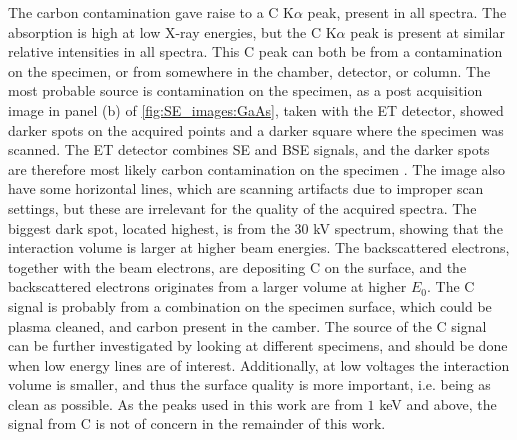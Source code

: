 The carbon contamination gave raise to a C K$\alpha$ peak, present in all spectra.
The absorption is high at low X-ray energies, but the C K$\alpha$ peak is present at similar relative intensities in all spectra.
This C peak can both be from a contamination on the specimen, or from somewhere in the chamber, detector, or column.
The most probable source is contamination on the specimen, as a post acquisition image in panel (b) of \cref{fig:SE_images:GaAs}, taken with the ET detector, showed darker spots on the acquired points and a darker square where the specimen was scanned.
The ET detector combines SE and BSE signals, and the darker spots are therefore most likely carbon contamination on the specimen \cite{goldstein_scanning_2018}.
The image also have some horizontal lines, which are scanning artifacts due to improper scan settings, but these are irrelevant for the quality of the acquired spectra.
The biggest dark spot, located highest, is from the $30$ kV spectrum, showing that the interaction volume is larger at higher beam energies.
The backscattered electrons, together with the beam electrons, are depositing C on the surface, and the backscattered electrons originates from a larger volume at higher $E_0$.
The C signal is probably from a combination on the specimen surface, which could be plasma cleaned, and carbon present in the camber.
The source of the C signal can be further investigated by looking at different specimens, and should be done when low energy lines are of interest.
Additionally, at low voltages the interaction volume is smaller, and thus the surface quality is more important, i.e. being as clean as possible.
As the peaks used in this work are from $1$ keV and above, the signal from C is not of concern in the remainder of this work.


